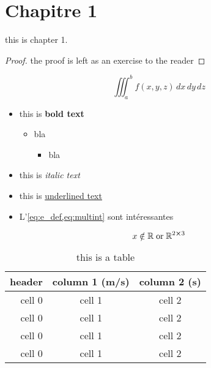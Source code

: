 \documentclass{article}
\begin{document}
\section{Chapitre 1}

\begin{thm}[Chapter 1]
	this is chapter 1.\\ 
\end{thm}
\begin{proof}
	the proof is left as an exercise to the reader
\end{proof}
\begin{cor}
	\begin{equation}
		\label{eq:multint}
		\iiint_a^b f(x,y,z) \, dx\,dy\,dz
	\end{equation}
\end{cor}

\begin{itemize}
	\item this is \textbf{bold text}
	\begin{itemize}
		\item bla
		\begin{itemize}
			\item bla 
		\end{itemize} 
	\end{itemize}
	\item this is \textit{italic text}
	\item this is \underline{underlined text}
	\item L'\cref{eq:e_def,eq:multint} sont intéressantes
\end{itemize}

\[x \notin \R \; \text{or} \; \M{R}{2}{3}\] %

\begin{table}[H]
	\centering
	\begin{tabular}{rcc}\toprule
		\textbf{header} & \textbf{column 1 (m/s)} & \textbf{column 2 (s)} \\\midrule
		cell 0          & cell 1                         & cell 2         \\
		cell 0          & cell 1                         & cell 2         \\
		cell 0          & cell 1                         & cell 2         \\
		cell 0          & cell 1                         & cell 2         \\
		\bottomrule
	\end{tabular}
	\caption{this is a table}
\end{table}
\end{document}
